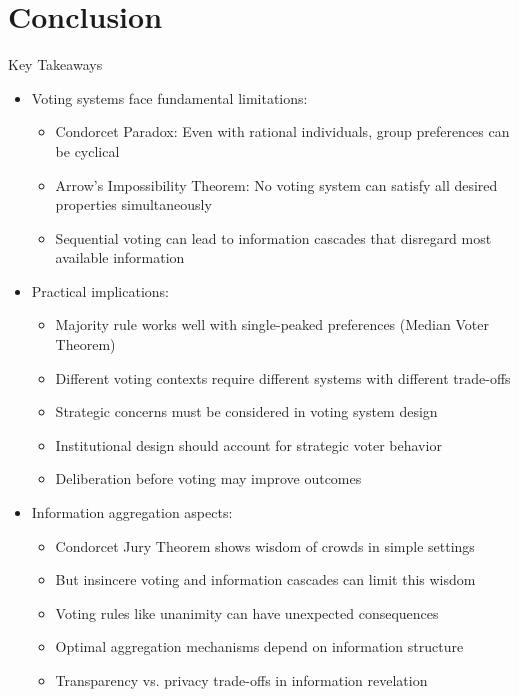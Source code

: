 \documentclass[10pt,handout]{beamer}
\begin{document}
\section{Conclusion}

\begin{frame}{Key Takeaways}
  \begin{itemize}[<+->]
    \item Voting systems face fundamental limitations:
      \begin{itemize}
        \item Condorcet Paradox: Even with rational individuals, group preferences can be cyclical
        \item Arrow's Impossibility Theorem: No voting system can satisfy all desired properties simultaneously
        \item Sequential voting can lead to information cascades that disregard most available information
      \end{itemize}
    \item Practical implications:
      \begin{itemize}
        \item Majority rule works well with single-peaked preferences (Median Voter Theorem)
        \item Different voting contexts require different systems with different trade-offs
        \item Strategic concerns must be considered in voting system design
        \item Institutional design should account for strategic voter behavior
        \item Deliberation before voting may improve outcomes
      \end{itemize}
    \item Information aggregation aspects:
      \begin{itemize}
        \item Condorcet Jury Theorem shows wisdom of crowds in simple settings
        \item But insincere voting and information cascades can limit this wisdom
        \item Voting rules like unanimity can have unexpected consequences
        \item Optimal aggregation mechanisms depend on information structure
        \item Transparency vs. privacy trade-offs in information revelation
      \end{itemize}
  \end{itemize}
\end{frame}
\end{document}
